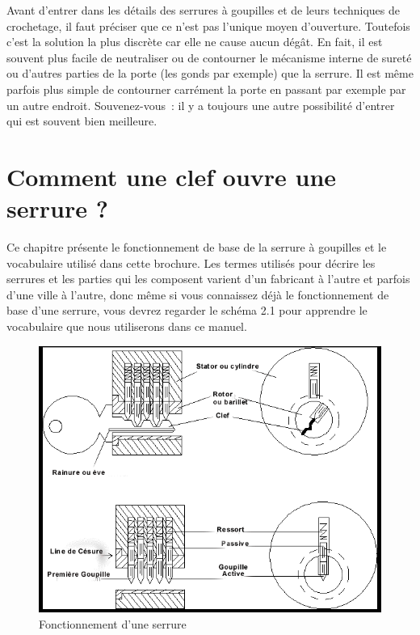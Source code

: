 \documentclass[a4paper,french,11pt,twoside]{report}
\begin{document}
Avant d'entrer dans les détails des serrures à goupilles et de leurs techniques de crochetage, il faut préciser que ce n'est pas l'unique moyen d'ouverture. Toutefois c'est la solution la plus discrète car elle ne cause aucun dégât. En fait, il est souvent plus facile de neutraliser ou de contourner le mécanisme interne de sureté ou d'autres parties de la porte (les gonds par exemple) que la serrure. Il est même parfois plus simple de contourner carrément la porte en passant par exemple par un autre endroit. Souvenez-vous~: il y a toujours une autre possibilité d'entrer qui est souvent bien meilleure.

\chapter{Comment une clef ouvre une serrure ?}
Ce chapitre présente le fonctionnement de base de la serrure à goupilles et le vocabulaire utilisé dans cette brochure. Les termes utilisés pour décrire les serrures et les parties qui les composent varient d'un fabricant à l'autre et parfois d'une ville à l'autre, donc même si vous connaissez déjà le fonctionnement de base d'une serrure, vous devrez regarder le schéma 2.1 pour apprendre le vocabulaire que nous utiliserons dans ce manuel.

\begin{figure}[h]
        \includegraphics[width=16cm]{images/image1}
        \caption{Fonctionnement d'une serrure}
\end{figure}
\end{document}
